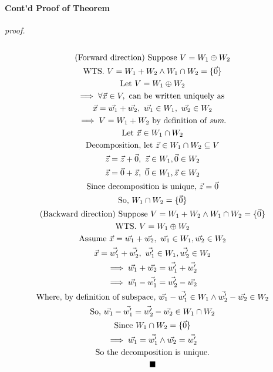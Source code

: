 \documentclass[11pt]{article}
\begin{document}
	\paragraph{Cont'd Proof of Theorem} \quad
	\newline 
	\emph{proof.}
	\begin{multline*}
		\\
		\text{(Forward direction) Suppose } V = W_1 \oplus W_2 \\
		\text{WTS. } V = W_1 + W_2 \land W_1 \cap W_2 = \{\vec{0}\} \\
		\text{Let } V = W_1 \oplus W_2 \\
		\implies \forall \vec{x} \in V, \text{ can be written uniquely as } \\
		\vec{x} = \vec{w_1} + \vec{w_2},\ \vec{w_1} \in W_1,\ \vec{w_2} \in W_2 \\
		\implies V = W_1 + W_2 \text{ by definition of \emph{sum}.} \\
		\text{Let } \vec{x} \in W_1 \cap W_2 \\
		\text{Decomposition, let } \vec{z} \in W_1 \cap W_2 \subseteq V\\
		\vec{z} = \vec{z} + \vec{0},\ \vec{z} \in W_1, \vec{0} \in W_2 \\
		\vec{z} = \vec{0} + \vec{z},\ \vec{0} \in W_1, \vec{z} \in W_2 \\
		\text{Since decomposition is unique, }\vec{z} = \vec{0} \\
		\text{So, } W_1 \cap W_2 = \{\vec{0}\} \\
		\text{(Backward direction) Suppose } V = W_1 + W_2 \land W_1 \cap W_2 = \{\vec{0}\} \\
		\text{WTS. } V = W_1 \oplus W_2 \\
		\text{Assume } \vec{x} = \vec{w_1} + \vec{w_2},\ \vec{w_1} \in W_1,\vec{w_2} \in W_2 \\
		\vec{x} = \vec{w_1'} + \vec{w_2'},\ \vec{w_1'} \in W_1,\vec{w_2'} \in W_2 \\
		\implies \vec{w_1} + \vec{w_2} = \vec{w_1'} + \vec{w_2'} \\
		\implies \vec{w_1} - \vec{w_1'} = \vec{w_2'} - \vec{w_2} \\
		\text{Where, by definition of subspace, } \vec{w_1} - \vec{w_1'} \in W_1 \land \vec{w_2'} - \vec{w_2} \in W_2 \\
		\text{So, }\vec{w_1} - \vec{w_1'} = \vec{w_2'} - \vec{w_2} \in W_1 \cap W_2 \\
		\text{Since } W_1 \cap W_2 = \{\vec{0}\} \\
		\implies \vec{w_1} = \vec{w_1'} \land \vec{w_2} = \vec{w_2'} \\
		\text{So the decomposition is unique.} \\
		\blacksquare
	\end{multline*}
	
\end{document}
